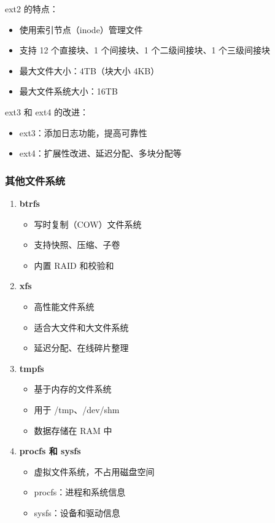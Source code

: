 ext2 的特点：
\begin{itemize}
  \item 使用索引节点（inode）管理文件
  \item 支持 12 个直接块、1 个间接块、1 个二级间接块、1 个三级间接块
  \item 最大文件大小：4TB（块大小 4KB）
  \item 最大文件系统大小：16TB
\end{itemize}

ext3 和 ext4 的改进：
\begin{itemize}
  \item ext3：添加日志功能，提高可靠性
  \item ext4：扩展性改进、延迟分配、多块分配等
\end{itemize}

\subsubsection{其他文件系统}

\begin{enumerate}
  \item \textbf{btrfs}
    \begin{itemize}
      \item 写时复制（COW）文件系统
      \item 支持快照、压缩、子卷
      \item 内置 RAID 和校验和
    \end{itemize}

  \item \textbf{xfs}
    \begin{itemize}
      \item 高性能文件系统
      \item 适合大文件和大文件系统
      \item 延迟分配、在线碎片整理
    \end{itemize}

  \item \textbf{tmpfs}
    \begin{itemize}
      \item 基于内存的文件系统
      \item 用于 /tmp、/dev/shm
      \item 数据存储在 RAM 中
    \end{itemize}

  \item \textbf{procfs 和 sysfs}
    \begin{itemize}
      \item 虚拟文件系统，不占用磁盘空间
      \item procfs：进程和系统信息
      \item sysfs：设备和驱动信息
    \end{itemize}
\end{enumerate}

